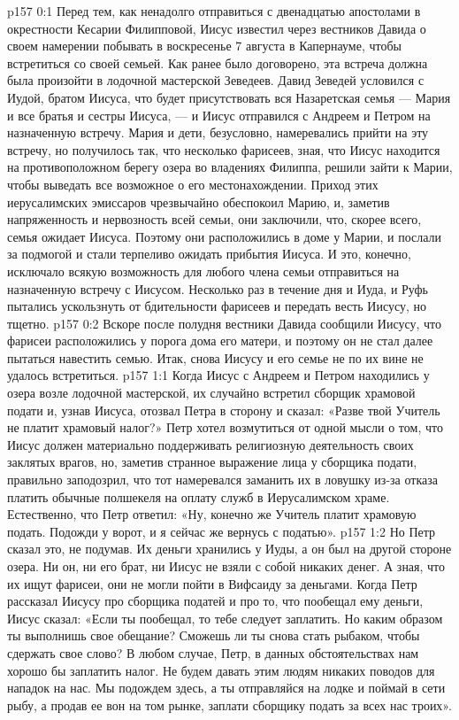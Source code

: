 \vs p157 0:1 Перед тем, как ненадолго отправиться с двенадцатью апостолами в окрестности Кесарии Филипповой, Иисус известил через вестников Давида о своем намерении побывать в воскресенье 7 августа в Капернауме, чтобы встретиться со своей семьей. Как ранее было договорено, эта встреча должна была произойти в лодочной мастерской Зеведеев. Давид Зеведей условился с Иудой, братом Иисуса, что будет присутствовать вся Назаретская семья --- Мария и все братья и сестры Иисуса, --- и Иисус отправился с Андреем и Петром на назначенную встречу. Мария и дети, безусловно, намеревались прийти на эту встречу, но получилось так, что несколько фарисеев, зная, что Иисус находится на противоположном берегу озера во владениях Филиппа, решили зайти к Марии, чтобы выведать все возможное о его местонахождении. Приход этих иерусалимских эмиссаров чрезвычайно обеспокоил Марию, и, заметив напряженность и нервозность всей семьи, они заключили, что, скорее всего, семья ожидает Иисуса. Поэтому они расположились в доме у Марии, и послали за подмогой и стали терпеливо ожидать прибытия Иисуса. И это, конечно, исключало всякую возможность для любого члена семьи отправиться на назначенную встречу с Иисусом. Несколько раз в течение дня и Иуда, и Руфь пытались ускользнуть от бдительности фарисеев и передать весть Иисусу, но тщетно.
\vs p157 0:2 Вскоре после полудня вестники Давида сообщили Иисусу, что фарисеи расположились у порога дома его матери, и поэтому он не стал далее пытаться навестить семью. Итак, снова Иисусу и его семье не по их вине не удалось встретиться.
\vs p157 1:1 Когда Иисус с Андреем и Петром находились у озера возле лодочной мастерской, их случайно встретил сборщик храмовой подати и, узнав Иисуса, отозвал Петра в сторону и сказал: «Разве твой Учитель не платит храмовый налог?» Петр хотел возмутиться от одной мысли о том, что Иисус должен материально поддерживать религиозную деятельность своих заклятых врагов, но, заметив странное выражение лица у сборщика подати, правильно заподозрил, что тот намеревался заманить их в ловушку из\hyp{}за отказа платить обычные полшекеля на оплату служб в Иерусалимском храме. Естественно, что Петр ответил: «Ну, конечно же Учитель платит храмовую подать. Подожди у ворот, и я сейчас же вернусь с податью».
\vs p157 1:2 Но Петр сказал это, не подумав. Их деньги хранились у Иуды, а он был на другой стороне озера. Ни он, ни его брат, ни Иисус не взяли с собой никаких денег. А зная, что их ищут фарисеи, они не могли пойти в Вифсаиду за деньгами. Когда Петр рассказал Иисусу про сборщика податей и про то, что пообещал ему деньги, Иисус сказал: «Если ты пообещал, то тебе следует заплатить. Но каким образом ты выполнишь свое обещание? Сможешь ли ты снова стать рыбаком, чтобы сдержать свое слово? В любом случае, Петр, в данных обстоятельствах нам хорошо бы заплатить налог. Не будем давать этим людям никаких поводов для нападок на нас. Мы подождем здесь, а ты отправляйся на лодке и поймай в сети рыбу, а продав ее вон на том рынке, заплати сборщику подать за всех нас троих».
